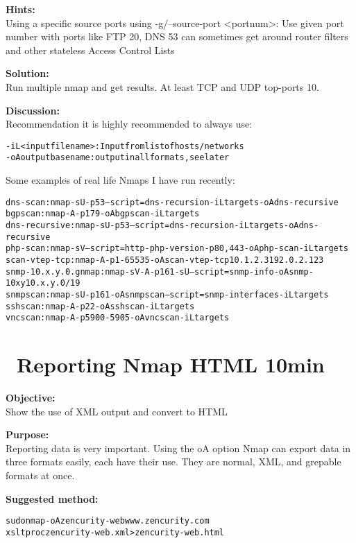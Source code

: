 \documentclass[a4paper,11pt,notitlepage]{report}
\begin{document}
{\bf Hints:} \\
Using a specific source ports using -g/--source-port <portnum>: Use given port number with ports like FTP 20, DNS 53 can sometimes get around router filters and other stateless Access Control Lists

{\bf Solution:}\\
Run multiple nmap and get results. At least TCP and UDP top-ports 10.

{\bf Discussion:}\\
Recommendation it is highly recommended to always use:
\begin{alltt}
-iL <inputfilename>: Input from list of hosts/networks
-oA outputbasename: output in all formats, see later
\end{alltt}

Some examples of real life Nmaps I have run recently:
\begin{alltt}
dns-scan: nmap -sU -p 53 --script=dns-recursion -iL targets -oA dns-recursive
bgpscan: nmap -A -p 179 -oA bgpscan -iL targets
dns-recursive: nmap -sU -p 53 --script=dns-recursion -iL targets -oA dns-recursive
php-scan: nmap -sV --script=http-php-version -p80,443 -oA php-scan -iL targets
scan-vtep-tcp: nmap -A -p 1-65535 -oA scan-vtep-tcp 10.1.2.3 192.0.2.123
snmp-10.x.y.0.gnmap: nmap -sV -A -p 161 -sU --script=snmp-info -oA snmp-10xy 10.x.y.0/19
snmpscan: nmap -sU -p 161 -oA snmpscan --script=snmp-interfaces -iL targets
sshscan: nmap -A -p 22 -oA sshscan -iL targets
vncscan: nmap -A -p 5900-5905 -oA vncscan -iL targets
\end{alltt}




\chapter{\faInfoCircle\ Reporting Nmap HTML 10min}
\label{ex:nmap-html}


{\bf Objective:} \\
Show the use of XML output and convert to HTML

{\bf Purpose:}\\
Reporting data is very important. Using the oA option Nmap can export data in three formats easily, each have their use. They are normal, XML, and grepable formats at once.

{\bf Suggested method:}\\
\begin{alltt}
  sudo nmap -oA zencurity-web www.zencurity.com
  xsltproc zencurity-web.xml > zencurity-web.html
\end{alltt}
\end{document}
